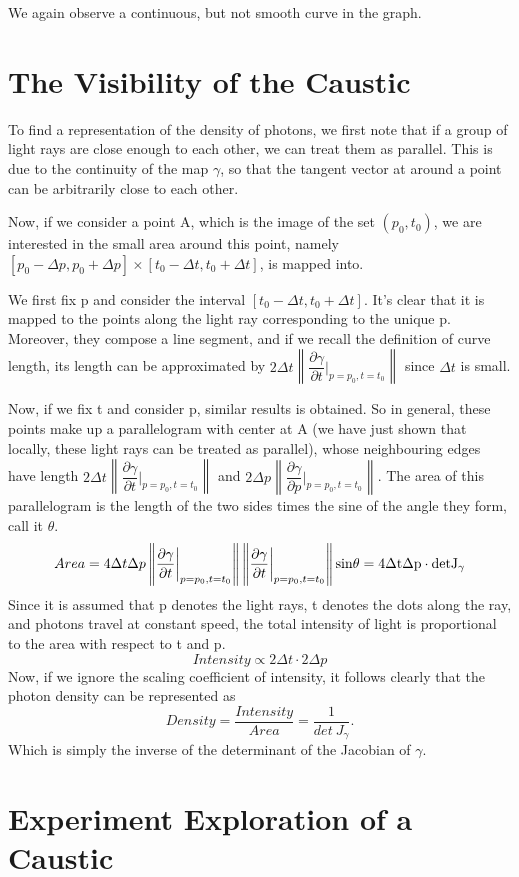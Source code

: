 \documentclass[a4paper]{article}
\begin{document}
We again observe a continuous, but not smooth curve in the graph.
\section{The Visibility of the Caustic}
To find a representation of the density of photons, we first note that if a group of light rays are close enough to each other, we can treat them as parallel. This is due to the continuity of the map $\gamma$, so that the tangent vector at around a point can be arbitrarily close to each other.

Now, if we consider a point A, which is the image of the set $(p_0,t_0)$, we are interested in the small area  around this point, namely $[p_0-\Delta p,p_0+\Delta p]\times[t_0-\Delta t,t_0+\Delta t]$, is mapped into.

We first fix p and consider the interval $[t_0-\Delta t,t_0+\Delta t]$. It's clear that it is  mapped to the points along the light ray corresponding to the unique p. Moreover, they compose a line segment, and if we recall the definition of curve length, its length can be approximated by $2\Delta t \left \| \dfrac{\partial \gamma}{\partial t}\bigg|_{p=p_0,t=t_0}\right \|$ since $\Delta t$ is small.

Now, if we fix t and consider p, similar results is obtained. So in general, these points make up a parallelogram with center at A (we have just shown that locally, these light rays can be treated as parallel), whose neighbouring edges have length $2\Delta t \left \| \dfrac{\partial \gamma}{\partial t}\bigg|_{p=p_0,t=t_0}\right \|$ and $2\Delta p \left \| \dfrac{\partial \gamma}{\partial p}\bigg|_{p=p_0,t=t_0}\right \|$. The area of this parallelogram is the length of the two sides times the sine of the angle they form, call it $\theta$. 
$$ Area=4\Delta t \Delta p \left \| \dfrac{\partial \gamma}{\partial t}\bigg|_{p=p_0,t=t_0}\right \|   \left \| \dfrac{\partial \gamma}{\partial t}\bigg|_{p=p_0,t=t_0}\right \|\rm{sin}\theta=4\Delta t \Delta p\cdot \rm{det}J_\gamma $$
Since it is assumed that p denotes the light rays, t denotes the dots along the ray, and photons travel at constant speed, the total intensity of light is proportional to the area with respect to t and p. 
$$ Intensity \propto 2\Delta t\cdot 2\Delta p$$
Now, if we ignore the scaling coefficient of intensity, it follows clearly that the photon density can be represented as
$$ Density=\dfrac{Intensity}{Area}=\dfrac{1}{det\ J_\gamma}.$$
Which is simply the inverse of the determinant of the Jacobian of $\gamma$.
\section{Experiment Exploration of a Caustic}
\end{document}
